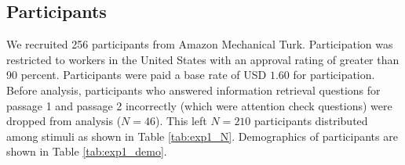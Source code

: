 \begin{table}[]
\caption{N for each condition in Experiment 1. }
\label{tab:exp1_N}
\end{table}


\subsection{Participants} 

We recruited 256 participants from Amazon Mechanical Turk. Participation was restricted to
workers in the United States with an approval rating of greater than 90 percent. Participants were paid a base rate of USD $1.60$ for participation. Before analysis, participants who answered information retrieval questions for passage 1 and passage 2 incorrectly (which were attention check questions) were dropped from analysis ($N = 46$).  This left $N = 210$ participants distributed among stimuli as shown in Table \ref{tab:exp1_N}. Demographics of participants are shown in Table \ref{tab:exp1_demo}.


